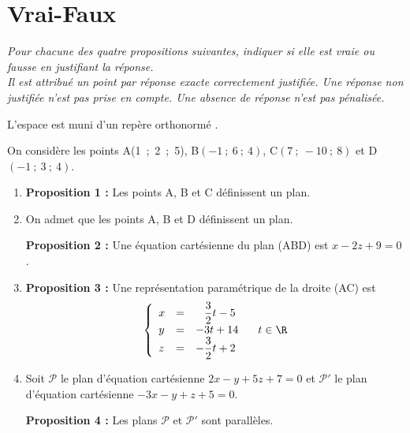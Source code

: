 \documentclass{cornouaille}
\begin{document}
\section{Vrai-Faux}
\begin{exercice}


\emph{Pour chacune des quatre propositions suivantes, indiquer si elle est vraie ou fausse en justifiant la réponse.\\ 
Il est attribué un point par réponse exacte correctement justifiée. Une réponse non justifiée n'est pas prise en compte. Une absence de réponse n'est pas pénalisée.}

\medskip
 
L'espace est muni d'un repère orthonormé \Oijk.
 
On considère les points A(1~;~2~;~5), B$(-1~;~6~;~4)$, C$(7~;~- 10~;~8)$ et D$(-1~;~3~;~4)$.

\medskip
 
\begin{enumerate}
\item \textbf{Proposition 1 :} Les points A, B et C définissent un plan. 
\item On admet que les points A, B et D définissent un plan. 

\textbf{Proposition 2 :} Une équation cartésienne du plan (ABD) est $x - 2z + 9 = 0$. 
\item \textbf{Proposition 3 :} Une représentation paramétrique de la droite (AC) est 
\[\left\{\begin{array}{l c l} 
x &=& \phantom{-}\dfrac{3}{2}t - 5\\ 
y &=& - 3t + 14\\
z &=&- \dfrac{3}{2}t + 2
\end{array}\right. \quad  t \in \R\]
 
\item Soit $\mathcal{P}$ le plan d'équation cartésienne $2x - y + 5z + 7 = 0$ et $\mathcal{P}'$ le plan d'équation cartésienne $- 3x - y + z + 5 = 0$.
 
\textbf{Proposition 4 :} Les plans $\mathcal{P}$ et $\mathcal{P}'$ sont parallèles. 
\end{enumerate}
\end{exercice}
\end{document}
